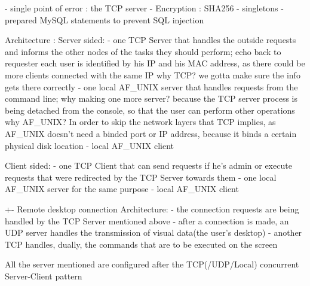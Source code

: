 - single point of error : the TCP server
- Encryption : SHA256
- singletons
- prepared MySQL statements to prevent SQL injection

Architecture : 
Server sided:
- one TCP Server that handles the outside requests and informs the other nodes of the tasks they should perform; echo back to requester
	each user is identified by his IP and his MAC address, as there could be more clients connected with the same IP
	why TCP? we gotta make sure the info gets there correctly
- one local AF_UNIX server that handles requests from the command line;
	why making one more server? because the TCP server process is being detached from the console, so that the user can perform other operations
	why AF_UNIX? In order to skip the network layers that TCP implies, as AF_UNIX doesn't need a binded port or IP address, because it binds a certain physical disk location
- local AF_UNIX client

Client sided:
- one TCP Client that can send requests if he's admin or execute requests that were redirected by the TCP Server towards them
- one local AF_UNIX server for the same purpose
- local AF_UNIX client

+- Remote desktop connection
Architecture:
- the connection requests are being handled by the TCP Server mentioned above
- after a connection is made, an UDP server handles the transmission of visual data(the user's desktop)
- another TCP handles, dually, the commands that are to be executed on the screen

All the server mentioned are configured after the TCP(/UDP/Local) concurrent Server-Client pattern
